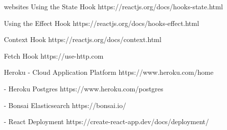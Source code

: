 \documentclass[a4paper,twoside,10pt]{report}
\begin{document}
\begin{thebibliography} {websites}
 Using the State Hook
https://reactjs.org/docs/hooks-state.html

 Using the Effect Hook
https://reactjs.org/docs/hooks-effect.html

 Context Hook
https://reactjs.org/docs/context.html

 Fetch Hook
https://use-http.com

 Heroku - Cloud Application Platform
https://www.heroku.com/home

 - Heroku Postgres
https://www.heroku.com/postgres

 - Bonsai Elasticsearch
https://bonsai.io/

 - React Deployment
https://create-react-app.dev/docs/deployment/
\end{thebibliography}



\appendix




\end{document}
